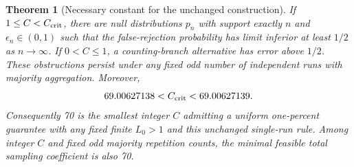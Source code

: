 \documentclass[10pt]{article}
\newtheorem{theorem}{Theorem}
\begin{document}
\begin{theorem}[Necessary constant for the unchanged construction]
If $1\le C<C_{\rm crit}$, there are null distributions $p_n$ with support
exactly $n$ and $\epsilon_n\in(0,1)$ such that the false-rejection probability
has limit inferior at least $1/2$ as $n\to\infty$.
If $0<C\le1$, a counting-branch alternative has error above $1/2$.
These obstructions persist under any fixed odd number of independent runs
with majority aggregation. Moreover,
\[
 69.00627138<C_{\rm crit}<69.00627139.
\]
Consequently 70 is the smallest integer $C$ admitting a uniform one-percent
guarantee with any fixed finite $L_0>1$ and this unchanged single-run rule.
Among integer $C$ and fixed odd majority repetition counts, the minimal
feasible total sampling coefficient is also 70.
\end{theorem}
\end{document}
